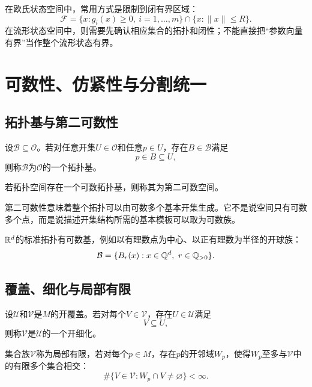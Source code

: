 在欧氏状态空间中，常用方式是限制到闭有界区域：
\[
    \mathcal F
    =
    \{x:g_i(x)\ge0,\ i=1,\ldots,m\}
    \cap
    \{x:\|x\|\le R\}.
\]
在流形状态空间中，则需要先确认相应集合的拓扑和闭性；不能直接把“参数向量有界”当作整个流形状态有界。


\section{可数性、仿紧性与分割统一}

\subsection{拓扑基与第二可数性}

\begin{definition}[拓扑基]
设$\mathcal B\subseteq\mathcal O$。若对任意开集$U\in\mathcal O$和任意$p\in U$，存在$B\in\mathcal B$满足
\[
    p\in B\subseteq U,
\]
则称$\mathcal B$为$\mathcal O$的一个拓扑基。
\end{definition}

\begin{definition}[第二可数]
若拓扑空间存在一个可数拓扑基，则称其为第二可数空间。
\end{definition}

第二可数性意味着整个拓扑可以由可数多个基本开集生成。它不是说空间只有可数多个点，而是说描述开集结构所需的基本模板可以取为可数族。

\begin{remark}[欧氏空间的第二可数性]
$\mathbb{R}^d$的标准拓扑有可数基，例如以有理数点为中心、以正有理数为半径的开球族：
\[
    \mathcal B
    =
    \{B_r(x):x\in\mathbb{Q}^d,\ r\in\mathbb{Q}_{>0}\}.
\]
\end{remark}

\subsection{覆盖、细化与局部有限}

\begin{definition}[覆盖的细化]
设$\mathcal U$和$\mathcal V$是$M$的开覆盖。若对每个$V\in\mathcal V$，存在$U\in\mathcal U$满足
\[
    V\subseteq U,
\]
则称$\mathcal V$是$\mathcal U$的一个开细化。
\end{definition}

\begin{definition}[局部有限族]
集合族$\mathcal V$称为局部有限，若对每个$p\in M$，存在$p$的开邻域$W_p$，使得$W_p$至多与$\mathcal V$中的有限多个集合相交：
\[
    \#\{V\in\mathcal V:W_p\cap V\neq\varnothing\}<\infty.
\]
\end{definition}

